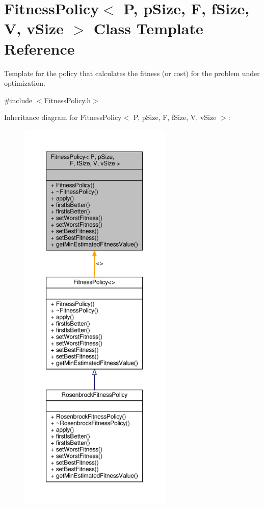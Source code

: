 \hypertarget{classFitnessPolicy}{}\section{Fitness\+Policy$<$ P, p\+Size, F, f\+Size, V, v\+Size $>$ Class Template Reference}
\label{classFitnessPolicy}


Template for the policy that calculates the fitness (or cost) for the problem under optimization.  




{\ttfamily \#include $<$Fitness\+Policy.\+h$>$}



Inheritance diagram for Fitness\+Policy$<$ P, p\+Size, F, f\+Size, V, v\+Size $>$\+:
\nopagebreak
\begin{figure}[H]
\begin{center}
\leavevmode
\includegraphics[height=550pt]{classFitnessPolicy__inherit__graph}
\end{center}
\end{figure}


